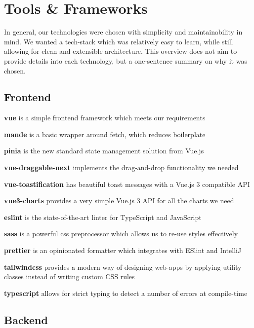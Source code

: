 \section{Tools \& Frameworks}

In general, our technologies were chosen with simplicity and maintainability in mind.
We wanted a tech-stack which was relatively easy to learn, while still allowing for clean and extensible architecture.
This overview does not aim to provide details into each technology, but a one-sentence summary on why it was chosen.

\subsection*{Frontend}

\begin{compactitem}
    \item \textbf{vue} is a simple frontend framework which meets our requirements
    \item \textbf{mande} is a basic wrapper around fetch, which reduces boilerplate
    \item \textbf{pinia} is the new standard state management solution from Vue.js
    \item \textbf{vue-draggable-next} implements the drag-and-drop functionality we needed
    \item \textbf{vue-toastification} has beautiful toast messages with a Vue.js 3 compatible API
    \item \textbf{vue3-charts} provides a very simple Vue.js 3 API for all the charts we need
    \item \textbf{eslint} is the state-of-the-art linter for TypeScript and JavaScript
    \item \textbf{sass} is a powerful css preprocessor which allows us to re-use styles effectively
    \item \textbf{prettier} is an opinionated formatter which integrates with ESlint and IntelliJ
    \item \textbf{tailwindcss} provides a modern way of designing web-apps by applying utility classes instead of writing custom CSS rules
    \item \textbf{typescript} allows for strict typing to detect a number of errors at compile-time
\end{compactitem}

\subsection*{Backend}

